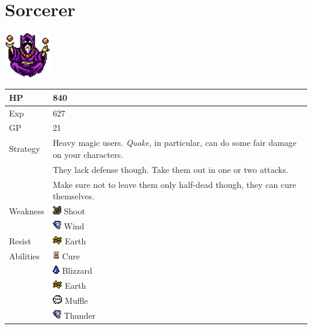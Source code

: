 \section{Sorcerer}
\label{monster:sorcerer}

\includegraphics[height=2cm,keepaspectratio]{./resources/monster/sorcerer}

\begin{longtable}{ l p{9cm} }
	HP
	& 840
\\ \hline
	Exp
	& 627
\\ \hline
	GP
	& 21
\\ \hline
	Strategy
	& Heavy magic users. \textit{Quake}, in particular, can do some fair damage on your characters. \\
	& They lack defense though. Take them out in one or two attacks. \\
	& Make sure not to leave them only half-dead though, they can cure themselves.
\\ \hline
	Weakness
	& \includegraphics[height=1em,keepaspectratio]{./resources/effects/shoot} Shoot \\
	& \includegraphics[height=1em,keepaspectratio]{./resources/effects/wind} Wind
\\ \hline
	Resist
	& \includegraphics[height=1em,keepaspectratio]{./resources/effects/earth} Earth
\\ \hline
	Abilities
	& \includegraphics[height=1em,keepaspectratio]{./resources/spells/cure} Cure \\
	& \includegraphics[height=1em,keepaspectratio]{./resources/effects/water} Blizzard \\
	& \includegraphics[height=1em,keepaspectratio]{./resources/effects/earth} Earth \\
	& \includegraphics[height=1em,keepaspectratio]{./resources/effects/silence} Muffle \\
	& \includegraphics[height=1em,keepaspectratio]{./resources/effects/wind} Thunder
\end{longtable}
